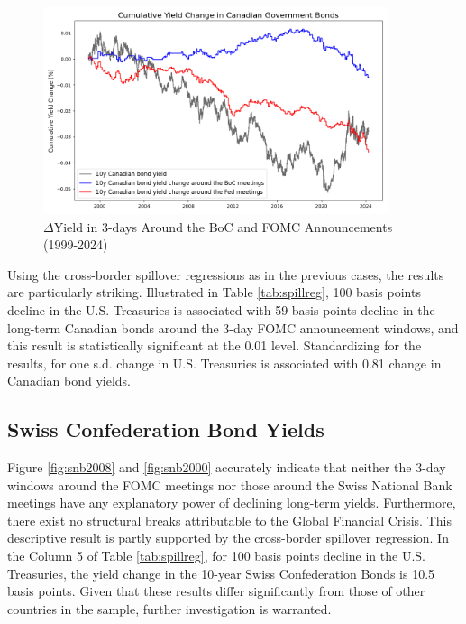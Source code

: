 \begin{figure}[!htbp]
    \centering
    \caption{$\Delta$Yield in 3-days Around the BoC and FOMC Announcements (1999-2024)}\includegraphics[width=0.9\textwidth]{figures/1999_canadian_bond_figure1a.png}

    \label{fig:boc1999}
\end{figure}

Using the cross-border spillover regressions as in the previous cases, the results are particularly striking. Illustrated in Table \ref{tab:spillreg}, 100 basis points decline in the U.S. Treasuries is associated with 59 basis points decline in the long-term Canadian bonds around the 3-day FOMC announcement windows, and this result is statistically significant at the 0.01 level. Standardizing for the results, for one s.d. change in U.S. Treasuries is associated with 0.81 change in Canadian bond yields.

\subsection{Swiss Confederation Bond Yields}

Figure \ref{fig:snb2008} and \ref{fig:snb2000} accurately indicate that neither the 3-day windows around the FOMC meetings nor those around the Swiss National Bank meetings have any explanatory power of declining long-term yields. Furthermore, there exist no structural breaks attributable to the Global Financial Crisis. This descriptive result is partly supported by the cross-border spillover regression. In the Column 5 of Table \ref{tab:spillreg}, for 100 basis points decline in the U.S. Treasuries, the yield change in the 10-year Swiss Confederation Bonds is 10.5 basis points. Given that these results differ significantly from those of other countries in the sample, further investigation is warranted. \\

